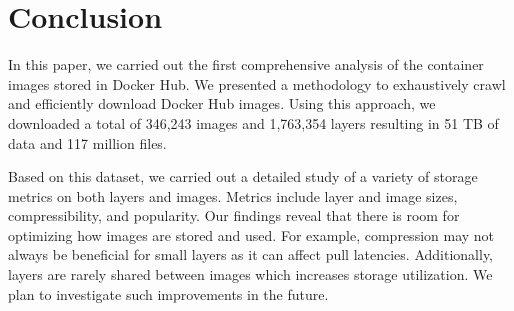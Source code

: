 \section{Conclusion}
\label{sec:conclusion}

In this paper, we carried out the first comprehensive analysis of the container images
stored in Docker Hub.
%
We presented a methodology to exhaustively crawl and efficiently download Docker Hub
images. Using this approach, we downloaded a total of 346,243 images and 1,763,354 layers
resulting in 51 TB of data and
117 million files.

Based on this dataset, we carried out a detailed study of a variety of storage
metrics on both layers and images. Metrics include layer and image sizes, compressibility,
and popularity. Our findings reveal that there is room for optimizing how images
are stored and used. For example, compression may not always be beneficial for small
layers as it can affect pull latencies. Additionally, layers are rarely shared between
images which increases storage utilization. We plan to investigate such improvements
in the future.

%
%
